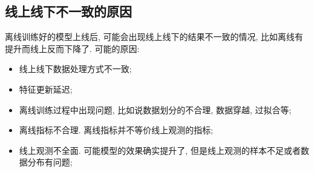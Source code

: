 \subsection{线上线下不一致的原因}
离线训练好的模型上线后, 可能会出现线上线下的结果不一致的情况, 比如离线有提升而线上反而下降了. 可能的原因:
\begin{itemize}
	\item 线上线下数据处理方式不一致;
	
	\item 特征更新延迟;
	
	\item 离线训练过程中出现问题, 比如说数据划分的不合理, 数据穿越, 过拟合等;
	
	\item 离线指标不合理. 离线指标并不等价线上观测的指标;
	
	\item 线上观测不全面. 可能模型的效果确实提升了, 但是线上观测的样本不足或者数据分布有问题;
\end{itemize}